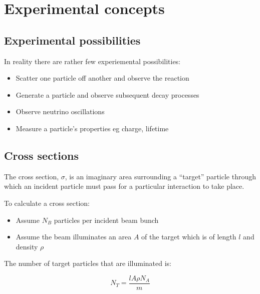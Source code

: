 
\chapter{Experimental concepts}

\section{Experimental possibilities}

In reality there are rather few experiemental possibilities:
\begin{itemize}
  \item Scatter one particle off another and observe the reaction
  \item Generate a particle and observe subsequent decay processes
  \item Observe neutrino oscillations
  \item Measure a particle's properties eg charge, lifetime
\end{itemize}

\section{Cross sections}

The cross section, $\sigma$, is an imaginary area surrounding a ``target'' particle through which an incident particle must pass for a particular interaction to take place.

To calculate a cross section:
\begin{itemize}
  \item Assume $N_B$ particles per incident beam bunch
  \item Assume the beam illuminates an area $A$ of the target which is of length $l$ and density $\rho$
\end{itemize}

The number of target particles that are illuminated is:

\[
  N_T = \frac{lA\rho N_A}{m}
\]

